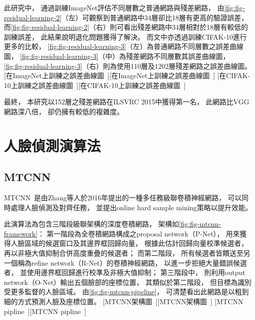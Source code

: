 \documentclass[class=NCU_thesis, crop=false]{standalone}
\begin{document}
此研究中，
通過訓練ImageNet評估不同層數之普通網路與殘差網路，
由\cref{fig:fig-residual-learning-2}（左）可觀察到普通網路中34層卻比18層有更高的驗證誤差，
而\cref{fig:fig-residual-learning-2}（右）則可看出殘差網路中34層相對於18層有較低的訓練誤差，
此結果說明退化問題獲得了解決。
而文中亦透過訓練CIFAK-10進行更多的比較，
\cref{fig:fig-residual-learning-3}（左）為普通網路不同層數之誤差曲線圖，
\cref{fig:fig-residual-learning-3}（中）為殘差網路不同層數其誤差曲線圖，
\cref{fig:fig-residual-learning-3}（右）則為使用110層及1202層殘差網路之誤差曲線圖。
[在ImageNet上訓練之誤差曲線圖~\cite{he_deep_2016}][在ImageNet上訓練之誤差曲線圖~\cite{he_deep_2016}]
[在CIFAK-10上訓練之誤差曲線圖~\cite{he_deep_2016}][在CIFAK-10上訓練之誤差曲線圖~\cite{he_deep_2016}]

最終，
本研究以152層之殘差網路在ILSVRC 2015中獲得第一名，
此網路比VGG網路深八倍，
卻仍擁有較低的複雜度。

\section{人臉偵測演算法}
\subsection{MTCNN}
MTCNN~\cite{zhang_joint_2016}是由Zhang等人於2016年提出的一種多任務級聯卷積神經網路，
可以同時處理人臉偵測及對齊任務，
並提出online hard sample mining策略以提升效能。

此演算法為包含三階段級聯架構的深度卷積網路，
架構如\cref{fig:fig-mtcnn-framework}：
第一階段為全卷積網路構成之proposal network（P-Net），
用來獲得人臉區域的候選窗口及其邊界框回歸向量，
根據此估計回歸向量校準候選者，
再以非極大值抑制合併高度重疊的候選者；
而第二階段，
所有候選者皆饋送至另一個稱為refine network（R-Net）的卷積神經網路，
以進一步拒絕大量錯誤候選者，
並使用邊界框回歸進行校準及非極大值抑制；
第三階段中，
則利用output network（O-Net）輸出五個臉部的座標位置，
其類似於第二階段，
但目標為識別受更多監督的人臉區域。
由\cref{fig:fig-mtcnn-pipeline}，
可清楚看出此網路是以粗到細的方式預測人臉及座標位置。
[MTCNN架構圖~\cite{zhang_joint_2016}][MTCNN架構圖~\cite{zhang_joint_2016}]
[MTCNN pipline~\cite{zhang_joint_2016}][MTCNN pipline~\cite{zhang_joint_2016}]
\end{document}
